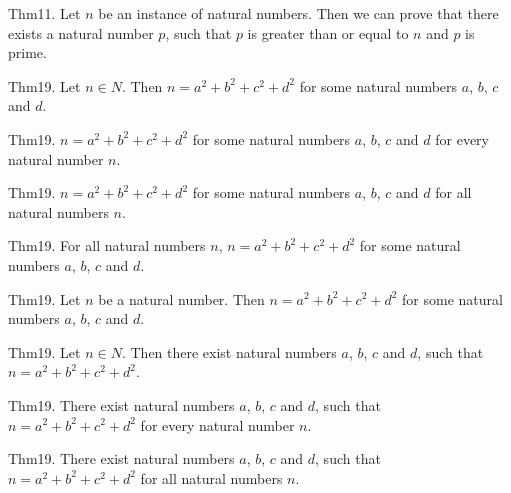 \documentclass{article}
\begin{document}
Thm11. Let $n$ be an instance of natural numbers. Then we can prove that there exists a natural number $p$, such that $p$ is greater than or equal to $n$ and $p$ is prime.

Thm19. Let $n \in N$. Then $n = a ^{ 2}+ b ^{ 2}+ c ^{ 2}+ d ^{ 2}$ for some natural numbers $a$, $b$, $c$ and $d$.

Thm19. $n = a ^{ 2}+ b ^{ 2}+ c ^{ 2}+ d ^{ 2}$ for some natural numbers $a$, $b$, $c$ and $d$ for every natural number $n$.

Thm19. $n = a ^{ 2}+ b ^{ 2}+ c ^{ 2}+ d ^{ 2}$ for some natural numbers $a$, $b$, $c$ and $d$ for all natural numbers $n$.

Thm19. For all natural numbers $n$, $n = a ^{ 2}+ b ^{ 2}+ c ^{ 2}+ d ^{ 2}$ for some natural numbers $a$, $b$, $c$ and $d$.

Thm19. Let $n$ be a natural number. Then $n = a ^{ 2}+ b ^{ 2}+ c ^{ 2}+ d ^{ 2}$ for some natural numbers $a$, $b$, $c$ and $d$.

Thm19. Let $n \in N$. Then there exist natural numbers $a$, $b$, $c$ and $d$, such that $n = a ^{ 2}+ b ^{ 2}+ c ^{ 2}+ d ^{ 2}$.

Thm19. There exist natural numbers $a$, $b$, $c$ and $d$, such that $n = a ^{ 2}+ b ^{ 2}+ c ^{ 2}+ d ^{ 2}$ for every natural number $n$.

Thm19. There exist natural numbers $a$, $b$, $c$ and $d$, such that $n = a ^{ 2}+ b ^{ 2}+ c ^{ 2}+ d ^{ 2}$ for all natural numbers $n$.
\end{document}
